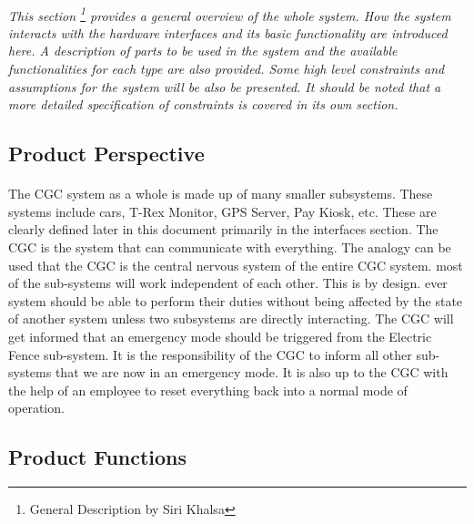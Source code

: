 \documentclass[12pt]{article}
\begin{document}
\paragraph{}\textit{This section \footnote{General Description by Siri Khalsa} provides 
a general overview of the whole system. How the system interacts with the hardware interfaces 
and its basic functionality are introduced here. A description of parts to be used in the 
system and the available functionalities for each type are also provided. Some high level 
constraints and assumptions for the system will be also be presented. It should be noted 
that a more detailed specification of constraints is covered in its own section.}
    
    \subsection{Product Perspective}
    \paragraph{} The CGC system as a whole is made up of many smaller subsystems. These systems include cars, T-Rex Monitor, GPS Server, Pay Kiosk, etc. These are clearly defined later in this document primarily in the interfaces section. The CGC is the system that can communicate with everything. The analogy can be used that the CGC is the central nervous system of the entire CGC system. most of the sub-systems will work independent of each other. This is by design. ever system should be able to perform their duties without being affected by the state of another system unless two subsystems are directly interacting. The CGC will get informed that an emergency mode should be triggered from the Electric Fence sub-system. It is the responsibility of the CGC to inform all other sub-systems that we are now in an emergency mode. It is also up to the CGC with the help of an employee to reset everything back into a normal mode of operation.

    \paragraph{} 
    \subsection{Product Functions}
\end{document}
